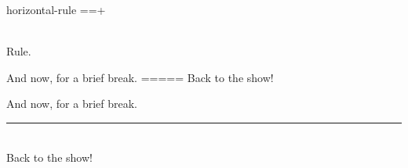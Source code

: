 \begin{identifier}{horizontal-rule}
==+
\end{identifier}
 \\

Rule. \\

\begin{examples}
  \example{==}{\rule{0.5\textwidth}{1pt}}
  \begin{examplesource}
And now, for a brief break.
=====
Back to the show!
  \end{examplesource}
  \begin{exampleoutput}
    And now, for a brief break. \\
    \rule{0.5\textwidth}{1pt} \\
    Back to the show!
  \end{exampleoutput}
\end{examples}

